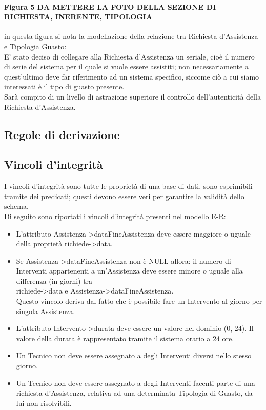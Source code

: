 \documentclass[legalpaper]{article}
\begin{document}
\paragraph{Figura 5  DA METTERE LA FOTO DELLA SEZIONE DI RICHIESTA, INERENTE, TIPOLOGIA}
in questa figura si nota la modellazione della relazione tra Richiesta d'Assistenza e Tipologia Guasto:\\
E' stato deciso di collegare alla Richiesta d'Assistenza un seriale, cioè il numero di serie del sistema per il quale si vuole essere assistiti; non necessariamente a quest'ultimo deve far riferimento ad un sistema specifico, siccome ciò a cui siamo interessati è il tipo di guasto presente.\\
Sarà compito di un livello di astrazione superiore il controllo dell'autenticità della Richiesta d'Assistenza.\\ 
\subsection{Regole di derivazione}


\subsection{Vincoli d'integrità}
I vincoli d'integrità sono tutte le proprietà di una base-di-dati, sono esprimibili 
tramite dei predicati; questi devono essere veri per garantire la validità dello schema.\\
\newline
Di seguito sono riportati i vincoli d'integrità presenti nel modello E-R:
\begin{itemize}
	\item L'attributo Assistenza->dataFineAssistenza deve essere maggiore o uguale\\ della proprietà richiede->data.
	\item Se Assistenza->dataFineAssistenza non è NULL allora: il numero di Interventi appartenenti a un'Assistenza deve essere minore o uguale alla differenza (in giorni) tra \\richiede->data e Assistenza->dataFineAssistenza.\\Questo vincolo deriva dal fatto che è possibile fare un Intervento al giorno per singola Assistenza.
	\item L'attributo Intervento->durata deve essere un valore nel dominio (0, 24).
	Il valore della durata è rappresentato tramite il sistema orario a 24 ore.
	\item Un Tecnico non deve essere assegnato a degli Interventi diversi nello stesso giorno.
	\item Un Tecnico non deve essere assegnato a degli Interventi facenti parte di una richiesta d'Assistenza, relativa ad una determinata Tipologia di Guasto, da lui non risolvibili.
	
\end{itemize}
\end{document}
